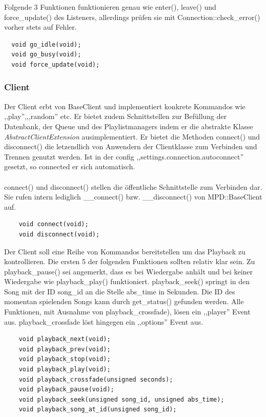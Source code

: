Folgende 3 Funktionen funktionieren genau wie enter(), leave() und force\_update() des Listeners,
allerdings prüfen sie mit Connection::check\_error() vorher stets auf Fehler.
\begin{verbatim}
  void go_idle(void);
  void go_busy(void);
  void force_update(void);
\end{verbatim}

%
%
%
%
\subsubsection{Client}
Der Client erbt von BaseClient und implementiert konkrete Kommandos wie ,,play'',,,random'' etc.
Er bietet zudem Schnittstellen zur Befüllung der Datenbank, der Queue und des Playlistmanagers indem 
er die abstrakte Klasse \emph{AbstractClientExtension} ausimplementiert.
Er bietet die Methoden connect() und disconnect() die letzendlich von Anwendern der Clientklasse zum Verbinden und Trennen genutzt werden. 
Ist in der config ,,settings.connection.autoconnect'' gesetzt, so connected er sich automatisch.
\\
\\
connect() und disconnect() stellen die öffentliche Schnittstelle zum Verbinden dar.
Sie rufen intern lediglich \_\_connect() bzw. \_\_disconnect() von MPD::BaseClient auf.
\begin{verbatim}
    void connect(void);
    void disconnect(void);
\end{verbatim}

Der Client soll eine Reihe von Kommandos bereitstellen um das Playback zu kontrollieren.
Die ersten 5 der folgenden Funktionen sollten relativ klar sein. 
Zu playback\_pause() sei angemerkt, dass es bei Wiedergabe anhält und bei keiner Wiedergabe wie playback\_play() funktioniert.
playback\_seek() springt in den Song mit der ID song\_id an die Stelle abs\_time in Sekunden.
Die ID des momentan spielenden Songs kann durch get\_status() gefunden werden.
Alle Funktionen, mit Ausnahme von playback\_crossfade), lösen ein ,,player'' Event aus. 
playback\_crossfade löst hingegen ein ,,options'' Event aus.
\begin{verbatim}
    void playback_next(void);
    void playback_prev(void);
    void playback_stop(void);
    void playback_play(void);
    void playback_crossfade(unsigned seconds);    
    void playback_pause(void);
    void playback_seek(unsigned song_id, unsigned abs_time);
    void playback_song_at_id(unsigned song_id);
\end{verbatim}

